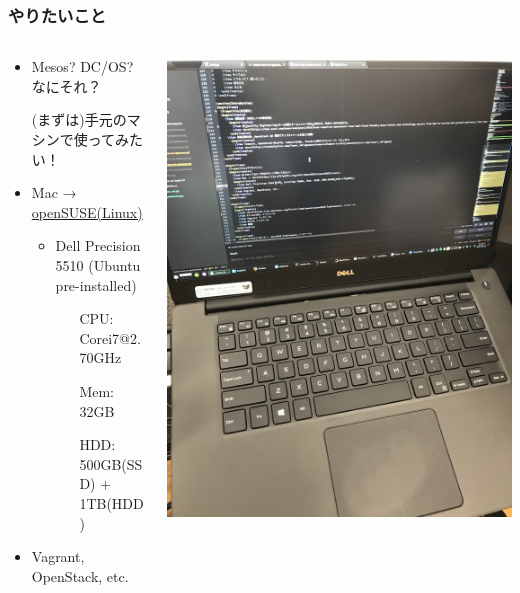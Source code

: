 \documentclass[aspectratio=169,11pt,hyperref={colorlinks=true}]{beamer}
\begin{document}
\begin{frame}
  \frametitle{やりたいこと}
  \begin{columns}[T]
    \begin{column}{.5\textwidth}
      \begin{itemize}
        \item Mesos? DC/OS? なにそれ？
        \item[] (まずは)手元のマシンで使ってみたい！
        \item Mac → \href{https://ja.wikipedia.org/wiki/OpenSUSE}{openSUSE(Linux)}
          \begin{itemize}
            \item Dell Precision 5510 (Ubuntu pre-installed)
            \begin{itemize}
              \item[CPU:] Corei7@2.70GHz
              \item[Mem:] 32GB
              \item[HDD:] 500GB(SSD) + 1TB(HDD)
            \end{itemize}
          \end{itemize}
        \item Vagrant, OpenStack, etc.
      \end{itemize}
    \end{column}
    \begin{column}{.5\textwidth}
      \includegraphics[height=1.1\textwidth]{dell_precision_5510.jpg}
    \end{column}
  \end{columns}
\end{frame}
\end{document}
